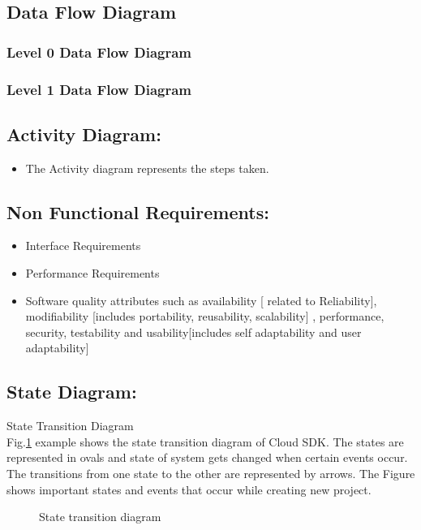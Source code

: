 \documentclass[oneside,a4paper,12pt]{report}
\begin{document}
\subsection{Data Flow Diagram}  
\subsubsection{Level 0 Data Flow Diagram}
\subsubsection{Level 1 Data Flow Diagram}
 



 
\subsection{Activity Diagram:}
\begin{itemize}
	\item	The Activity diagram represents the steps taken.
\end{itemize} 

\subsection{Non Functional Requirements:}
\begin{itemize}
	\item	Interface Requirements
	\item	Performance Requirements
    \item	Software quality attributes such as availability [ related to Reliability], modifiability [includes portability, reusability, scalability] ,  		performance, security, testability and usability[includes self 			adaptability and user adaptability] 
\end{itemize} 

\subsection{State Diagram:}	
  State Transition Diagram\\
Fig.\ref{fig:state-dig} example shows the state transition diagram of Cloud SDK. The states are
represented in ovals and state of system gets changed when certain events occur. The transitions from one state to the other are represented by arrows. The Figure    shows important states and events that occur while creating new project.

\begin{center}
	\begin{figure}[!htbp]
		\centering
	  \caption{State transition diagram}
	  \label{fig:state-dig}
	\end{figure}
\end{center} 
 
\end{document}
